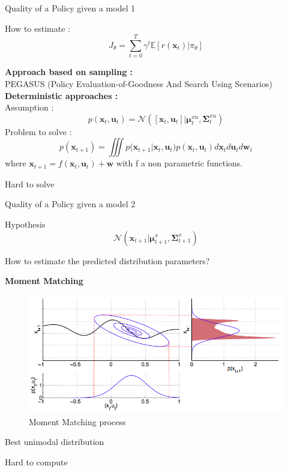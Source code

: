 \documentclass[10pt]{beamer}
\begin{document}
\begin{frame}{Quality of a Policy given a model 1}
\begin{exampleblock}{How to estimate :}
$$
{ J }_{ \theta  }=\sum _{ t=0 }^{ T }{ { \gamma  }^{ t }\mathbb{E}  } [ r({ \bm{x} }_{ t }) | { \pi  }_{ \theta  }]  
$$
\end{exampleblock}
\textbf{Approach based on sampling : }\\
PEGASUS (Policy Evaluation-of-Goodness And Search Using Scenarios)\\

\textbf{Deterministic approaches : }\\
Assumption :
$$
p(\bm{x}_{t},\bm{u}_{t})= \mathcal{N}([ { \bm{x} }_{ t },{ \bm{u} }_{ t }] |{ \bm{\mu}  }_{ t }^{ xu },{ \bm{\Sigma}  }_{ t }^{ xu })
$$
Problem to solve :
$$
p({ \bm{x} }_{ t+1 })=\iiint { p({ \bm{x} }_{ t+1 }| } {\bm{ x} }_{ t },{ \bm{u} }_{ t })p({ \bm{x} }_{ t },{ \bm{u} }_{ t })d{\bm{ x} }_{ t }d{ \bm{u} }_{ t }d{ \bm{w} }_{ t }
$$
where $\bm{x}_{t+1} =f(\bm{x}_{t},\bm{u}_{t}) +\bm{w}$ with f a non parametric functions. 

\begin{alertblock}{Hard to solve}
\end{alertblock}
\end{frame}

\begin{frame}{Quality of a Policy given a model 2 }
\begin{exampleblock}{Hypothesis}
$$
\mathcal{N}(\bm{x}_{t+1}|\bm{\mu}_{t+1}^{x},\bm{\Sigma}_{t+1}^{x})
$$
\end{exampleblock}
\begin{alertblock}{How to estimate the predicted distribution parameters? }
\end{alertblock}

\textbf{Moment Matching}
\begin{figure}[h]
\begin{center}
\includegraphics[scale=.20]{images/MomentMatching.png} 
\end{center}
\caption{Moment Matching process}
\label{}
\end{figure}
\begin{exampleblock}{Best unimodal distribution}
\end{exampleblock}

\begin{alertblock}{Hard to compute}
\end{alertblock}
\end{frame}
\end{document}
